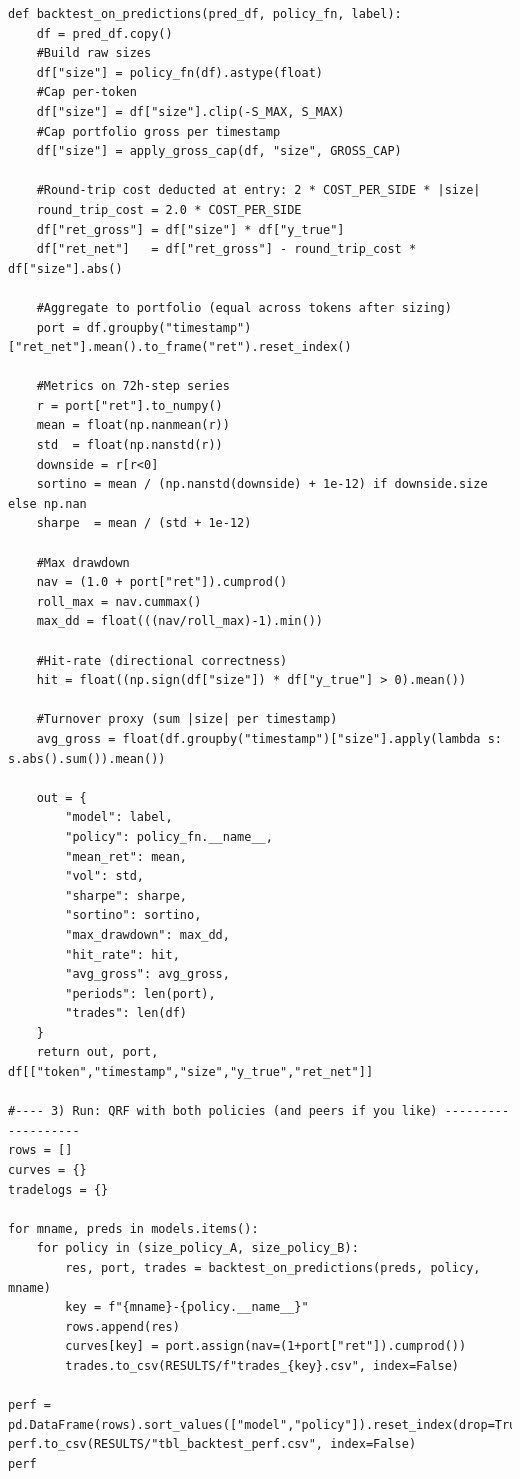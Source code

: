 \documentclass[
  a4paper,
  DIV=11,
  numbers=noendperiod]{scrreprt}
\begin{document}
\begin{verbatim}
def backtest_on_predictions(pred_df, policy_fn, label):
    df = pred_df.copy()
    #Build raw sizes
    df["size"] = policy_fn(df).astype(float)
    #Cap per-token
    df["size"] = df["size"].clip(-S_MAX, S_MAX)
    #Cap portfolio gross per timestamp
    df["size"] = apply_gross_cap(df, "size", GROSS_CAP)

    #Round-trip cost deducted at entry: 2 * COST_PER_SIDE * |size|
    round_trip_cost = 2.0 * COST_PER_SIDE
    df["ret_gross"] = df["size"] * df["y_true"]
    df["ret_net"]   = df["ret_gross"] - round_trip_cost * df["size"].abs()

    #Aggregate to portfolio (equal across tokens after sizing)
    port = df.groupby("timestamp")["ret_net"].mean().to_frame("ret").reset_index()

    #Metrics on 72h-step series
    r = port["ret"].to_numpy()
    mean = float(np.nanmean(r))
    std  = float(np.nanstd(r))
    downside = r[r<0]
    sortino = mean / (np.nanstd(downside) + 1e-12) if downside.size else np.nan
    sharpe  = mean / (std + 1e-12)

    #Max drawdown
    nav = (1.0 + port["ret"]).cumprod()
    roll_max = nav.cummax()
    max_dd = float(((nav/roll_max)-1).min())

    #Hit-rate (directional correctness)
    hit = float((np.sign(df["size"]) * df["y_true"] > 0).mean())

    #Turnover proxy (sum |size| per timestamp)
    avg_gross = float(df.groupby("timestamp")["size"].apply(lambda s: s.abs().sum()).mean())

    out = {
        "model": label,
        "policy": policy_fn.__name__,
        "mean_ret": mean,
        "vol": std,
        "sharpe": sharpe,
        "sortino": sortino,
        "max_drawdown": max_dd,
        "hit_rate": hit,
        "avg_gross": avg_gross,
        "periods": len(port),
        "trades": len(df)
    }
    return out, port, df[["token","timestamp","size","y_true","ret_net"]]

#---- 3) Run: QRF with both policies (and peers if you like) -------------------
rows = []
curves = {}
tradelogs = {}

for mname, preds in models.items():
    for policy in (size_policy_A, size_policy_B):
        res, port, trades = backtest_on_predictions(preds, policy, mname)
        key = f"{mname}-{policy.__name__}"
        rows.append(res)
        curves[key] = port.assign(nav=(1+port["ret"]).cumprod())
        trades.to_csv(RESULTS/f"trades_{key}.csv", index=False)

perf = pd.DataFrame(rows).sort_values(["model","policy"]).reset_index(drop=True)
perf.to_csv(RESULTS/"tbl_backtest_perf.csv", index=False)
perf
\end{verbatim}
\end{document}
